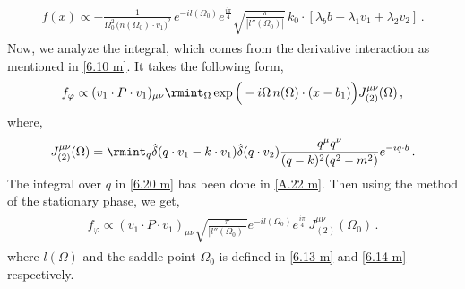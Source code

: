 \begin{align}
    \begin{split}
    f(x)\propto -\frac{1}{\Omega_0^2 \,\Big(n(\Omega_0)\cdot v_1 \Big)^2} \,e^{-il(\Omega_0)}e^{\frac{i\pi}{4}}\sqrt{\frac{\pi}{|l''(\Omega_0)|}}\,k_0\cdot[\lambda_b b+\lambda_1 v_{1}+\lambda_2 v_{2}]\,.
    \end{split}
\end{align}
Now, we analyze the integral, which comes from the derivative interaction as mentioned in \eqref{6.10 m}. It takes the following form,
\begin{align}
    \begin{split}
       f_{\varphi}\propto (v_1\cdot P\cdot v_1)_{\mu\nu} \rmint_{\Omega}\exp\Big(-i\Omega\,n(\Omega)\cdot (x-b_1)\Big)J_{(2)}^{\mu\nu}(\Omega)\,,
    \end{split}
\end{align}
where,
\begin{align}
    \begin{split}
        J_{(2)}^{\mu\nu}(\Omega)=\rmint_{q}\hat\delta(q\cdot v_1-k\cdot v_1)\hat\delta(q\cdot v_2)\frac{q^\mu q^\nu}{(q-k)^2(q^2-m^2)}e^{-iq \cdot b}\,.\label{6.20 m}
    \end{split}
\end{align}
The integral over $q$ in \eqref{6.20 m} has been done in \eqref{A.22 m}. Then using the method of the stationary phase, we get,
\begin{align}
    \begin{split}
        f_{\varphi}\propto (v_1\cdot P\cdot v_1)_{\mu\nu}\sqrt{\frac{\pi}{|l''(\Omega_0)|}}e^{-il(\Omega_0)}e^{\frac{i\pi}{4}}\,J^{\mu\nu}_{(2)}(\Omega_0)\,.
    \end{split}
\end{align}
where $l(\Omega)$ and the saddle point $\Omega_0$ is defined in \eqref{6.13 m} and \eqref{6.14 m} respectively.


